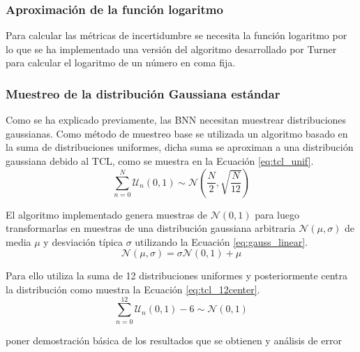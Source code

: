 \subsubsection{Aproximación de la función logaritmo}

Para calcular las métricas de incertidumbre se necesita la función logaritmo por lo que se ha implementado una versión del algoritmo desarrollado por Turner \cite{binary_log} para calcular el logaritmo de un número en coma fija.

\subsubsection{Muestreo de la distribución Gaussiana estándar}

Como se ha explicado previamente, las BNN necesitan muestrear distribuciones gaussianas. Como método de muestreo base se utilizada un algoritmo basado en la suma de distribuciones uniformes, dicha suma se aproximan a una distribución gaussiana debido al TCL, como se muestra en la Ecuación \ref{eq:tcl_unif}.
\begin{equation} \label{eq:tcl_unif}
\sum_{n=0}^{N} \mathcal{U}_n(0,1) \sim \mathcal{N} \left( \dfrac{N}{2}, \sqrt{\dfrac{N}{12}} \right)
\end{equation}

El algoritmo implementado genera muestras de $\mathcal{N}(0,1)$ para luego transformarlas en muestras de una distribución gaussiana arbitraria $\mathcal{N}(\mu, \sigma)$ de media $\mu$ y desviación típica $\sigma$ utilizando la Ecuación \ref{eq:gauss_linear}.
\begin{equation} \label{eq:gauss_linear}
\mathcal{N}(\mu, \sigma) = \sigma \mathcal{N}(0,1) + \mu
\end{equation}

Para ello utiliza la suma de 12 distribuciones uniformes y posteriormente centra la distribución como muestra la Ecuación \ref{eq:tcl_12center}.
\begin{equation} \label{eq:tcl_12center}
\sum_{n=0}^{12} \mathcal{U}_n(0,1) - 6 \sim \mathcal{N}(0,1)
\end{equation}

\todo poner demostración básica de los resultados que se obtienen y análisis de error

